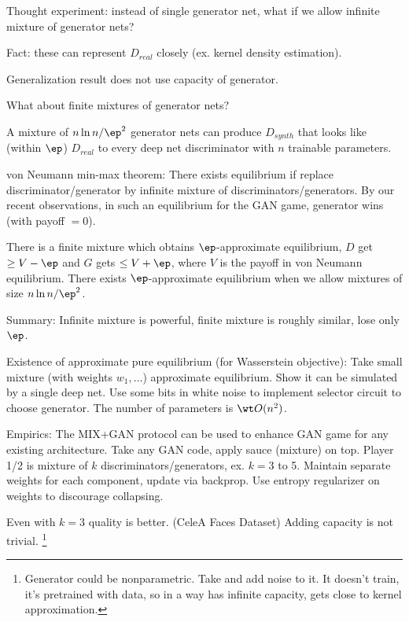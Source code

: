 Thought experiment: instead of single generator net, what if we allow infinite mixture of generator nets? 

Fact: these can represent $D_{real}$ closely (ex. kernel density estimation). %

Generalization result does not use capacity of generator.

What about finite mixtures of generator nets?

\begin{thm}
A mixture of $n\ln n/\ep^2$ generator nets can produce $D_{synth}$ that looks like (within $\ep$) $D_{real}$ to every deep net discriminator with $n$ trainable parameters. 
\end{thm}

von Neumann min-max theorem: There exists equilibrium if replace discriminator/generator by infinite mixture of discriminators/generators. By our recent observations, in such an equilibrium for the GAN game, generator wins (with payoff $=0$). %

There is a finite mixture which obtains $\ep$-approximate equilibrium, $D$ get $\ge V-\ep$ and $G$ gets $\le V+\ep$, where $V$ is the payoff in von Neumann equilibrium. 
There exists $\ep$-approximate equilibrium when we allow mixtures of size $n\ln n/\ep^2$. 

Summary: Infinite mixture is powerful, finite mixture is roughly similar, lose only $\ep$.

Existence of approximate pure equilibrium (for Wasserstein objective): Take small mixture (with weights $w_1,\ldots$) approximate equilibrium. Show it can be simulated by a single deep net. Use some bits in white noise to implement selector circuit to choose generator.
The number of parameters is $\wt O(n^2)$. 

Empirics: The MIX+GAN protocol can be used to enhance GAN game for any existing architecture. Take any GAN code, apply sauce (mixture) on top. Player 1/2 is mixture of $k$ discriminators/generators, ex. $k=3$ to 5.  Maintain separate weights for each component, update via backprop. Use entropy regularizer on weights to discourage collapsing.

Even with $k=3$ quality is better. (CeleA Faces Dataset) Adding capacity is not trivial. %
\footnote{Generator could be nonparametric. Take and add noise to it. It doesn't train, it's pretrained with data, so in a way has infinite capacity, gets close to kernel approximation.}

